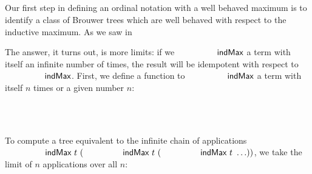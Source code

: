 \begin{code}[hide]
\AgdaSpace{}%
\AgdaSpace{}%
\AgdaSymbol{)}\AgdaSpace{}%
\<%
\\
%
\>[2]\AgdaSpace{}%
\AgdaSpace{}%
\AgdaSpace{}%
\AgdaSpace{}%
\AgdaSpace{}%
\AgdaSpace{}%
\<%
\\
%
\>[2]\AgdaSpace{}%
\AgdaSpace{}%
\AgdaSpace{}%
\AgdaSpace{}%
\AgdaSpace{}%
\AgdaSpace{}%
\AgdaSpace{}%
\<%
\\
%
\>[2]\<%
\\
\>[2][@{}l@{\AgdaIndent{0}}]%
\>[4]\AgdaSpace{}%
\AgdaSpace{}%
\<%
\end{code}

Our first step in defining an ordinal notation with a well behaved maximum
is to identify a class of Brouwer trees which are well behaved with
respect to the inductive maximum.
As we saw in

The answer, it turns out, is more limits:
if we $\indMax$ a term with itself an infinite number of times,
the result will be idempotent with respect to $\indMax$.
First, we define a function to $\indMax$ a term with itself $n$
times or a given number $n$:
\begin{code}%
%
\>[4]\AgdaSpace{}%
\AgdaSymbol{:}\AgdaSpace{}%
\AgdaSpace{}%
\AgdaSpace{}%
\AgdaSpace{}%
\AgdaSpace{}%
\<%
\\
%
\>[4]\AgdaSpace{}%
\AgdaSpace{}%
\AgdaSpace{}%
\AgdaSymbol{=}\AgdaSpace{}%
\<%
\\
%
\>[4]\AgdaSpace{}%
\AgdaSpace{}%
\AgdaSymbol{(}\AgdaSpace{}%
\AgdaSymbol{)}\AgdaSpace{}%
\AgdaSymbol{=}\AgdaSpace{}%
\AgdaSpace{}%
\AgdaSymbol{(}\AgdaSpace{}%
\AgdaSpace{}%
\AgdaSymbol{)}\AgdaSpace{}%
\<%
\end{code}

To compute
a tree equivalent to the infinite
chain of applications $\indMax\ t\ (\indMax\ t\ (\indMax\ t\ \ldots))$,
we take the limit of $n$ applications over all $n$:
\begin{code}%
%
\>[4]\AgdaSpace{}%
\AgdaSymbol{:}\AgdaSpace{}%
\AgdaSpace{}%
\AgdaSpace{}%
\<%
\\
%
\>[4]\AgdaSpace{}%
\AgdaSpace{}%
\AgdaSymbol{=}%
\>[17]\AgdaSpace{}%
\AgdaSpace{}%
\AgdaSpace{}%
\AgdaSpace{}%
\AgdaSpace{}%
\AgdaSpace{}%
\AgdaSymbol{)}\<%
\end{code}

